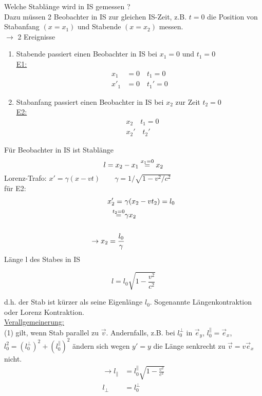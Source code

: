 \documentclass[titlepage,12pt,a4paper,ngerman]{report}
\newcommand{\frbox}[2]{\begin{tcolorbox}[colback=white,colframe=red!75!black,fonttitle=\bfseries,title=#1]#2\end{tcolorbox}} %
\begin{document}
Welche Stablänge wird in IS gemessen ?\\
Dazu müssen 2 Beobachter in IS zur gleichen IS-Zeit, z.B. $ t=0 $ die Position von Stabanfang $ (x=x_1) $ und Stabende $ (x=x_2) $ messen.\\
$ \rightarrow $ 2 Ereignisse
\begin{enumerate}[1)]
	\item Stabende passiert einen Beobachter in IS bei $ x_1 = 0 $ und $ t_1 = 0 $\\
	\underline{E1:}
	\begin{align*}
	x_1 &= 0 \quad t_1 = 0\\
	x'_1 &= 0 \quad t_1' = 0
	\end{align*}
	\item Stabanfang passiert einen Beobachter in IS bei $ x_2 $ zur Zeit $ t_2 = 0 $\\
	\underline{E2:}
	\begin{align*}
	&x_2 \quad t_1 = 0\\
	&x_2' \quad t_2'
	\end{align*}
\end{enumerate}
Für Beobachter in IS ist Stablänge
$$ l = x_2 - x_1 \buildrel x_1 = 0 \over = x_2 $$
Lorenz-Trafo: $ x' = \gamma (x-vt) \qquad \gamma = 1 / \sqrt{1-v^2/c^2} $\\
für E2:
\begin{align*}
x_2' = \  &\gamma (x_2 - v t_2) = l_0 \\
\buildrel t_2 = 0 \over = &\gamma x_2 \\\\
\rightarrow x_2 = \frac{l_0}{\gamma}
\end{align*}
Länge l des Stabes in IS 
\frbox{Längenkontraktion}{
\begin{equation*}
l = l_0 \sqrt{1-\frac{v^2}{c^2}} \tag{1}
\end{equation*}}
d.h. der Stab ist kürzer als seine Eigenlänge $ l_0 $. Sogenannte Längenkontraktion oder Lorenz Kontraktion.\\[5pt]
\underline{Verallgemeinerung:}\\
(1) gilt, wenn Stab parallel zu $ \vec{v} $. Andernfalls, z.B. bei $ l_0^\perp $ in $ \vec{e}_y $, $ l_0^\parallel = \vec{e}_x $, $ l_0^2 = (l_0^\perp)^2 + (l_0^\parallel)^2  $ ändern sich wegen $ y' = y $ die Länge senkrecht zu $ \vec{v} = v \vec{e}_x $ nicht.
\begin{align*}
\rightarrow l_{\parallel} &= l_0 ^\parallel \sqrt{1-\frac{v^2}{c^2}}\\
l_{\perp} &= l_0^\perp
\end{align*}
\end{document}
